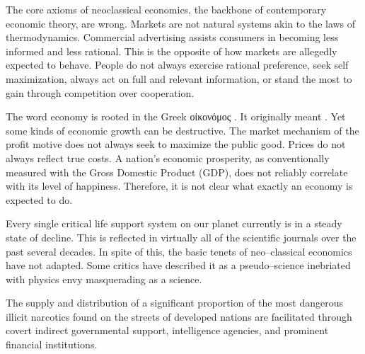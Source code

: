 
The core axioms of neoclassical economics, the backbone of contemporary economic theory, are wrong. Markets are not natural systems akin to the laws of thermodynamics.
\footnotecite[lasn2012]
Commercial advertising assists consumers in becoming less informed and less rational. This is the opposite of how markets are allegedly expected to behave. People do not always exercise rational preference, seek self maximization, always act on full and relevant information, 
or stand the most to gain through competition over cooperation.

The word economy is rooted in the Greek
\begingroup
{}
οἰκονόμος
\endgroup. It originally meant . Yet some kinds of economic growth can be destructive.
\footnotecite[h2oil]
The market mechanism of the profit motive does not always seek to maximize the public good.
Prices do not always reflect true costs.
\footnotecite[roberts2013]
\footnotecite[cobb1999]
\footnotecite[oxfam2004]
\footnotecite[raj2010]
\footnotecite[extras={ See sections 4.6 and 4.11.}][agenda_21]
A nation's economic prosperity, as conventionally measured with the Gross Domestic Product (GDP), does not reliably correlate with its level of happiness.
 Therefore, it is not clear what exactly an economy is expected to do.

Every single critical life support system on our planet currently is in a steady state of decline. This is reflected in virtually all of the scientific journals over the past several decades. In spite of this, the basic tenets of neo--classical economics have not adapted. Some critics have described it as a pseudo--science inebriated with physics envy masquerading as a science.


The supply and distribution of a significant proportion of the most dangerous illicit narcotics found on the streets of developed nations are facilitated through covert indirect governmental support, intelligence agencies, and prominent financial institutions.
\footnotecite[webb1996]

